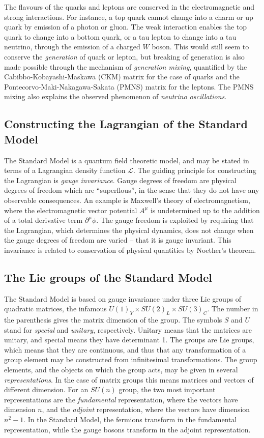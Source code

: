 \documentclass[twoside,english]{uiofysmaster}
\begin{document}
The flavours of the quarks and leptons are conserved in the electromagnetic and strong interactions. For instance, a top quark cannot change into a charm or up quark by emission of a photon or gluon. The weak interaction enables the top quark to change into a bottom quark, or a tau lepton to change into a tau neutrino, through the emission of a charged $W$ boson. This would still seem to conserve the {\it generation} of quark or lepton, but breaking of generation is also made possible through the mechanism of {\it generation mixing}, quantified by the Cabibbo-Kobayashi-Maskawa (CKM) matrix for the case of quarks and the Pontecorvo-Maki-Nakagawa-Sakata (PMNS) matrix for the leptons. The PMNS mixing also explains the observed phenomenon of {\it neutrino oscillations}.

\subsection{Constructing the Lagrangian of the Standard Model}

The Standard Model is a quantum field theoretic model, and may be stated in terms of a Lagrangian density function $\mathcal{L}$. The guiding principle for constructing the Lagrangian is {\it gauge invariance}. Gauge degrees of freedom are physical degrees of freedom which are ``superflous'', in the sense that they do not have any observable consequences. An example is Maxwell's theory of electromagnetism, where the electromagnetic vector potential $A^\mu$ is undetermined up to the addition of a total derivative term $\partial^\mu \phi$. The gauge freedom is exploited by requiring that the Lagrangian, which determines the physical dynamics, does not change when the gauge degrees of freedom are varied -- that it is gauge invariant. This invariance is related to conservation of physical quantities by Noether's theorem.

\subsection{The Lie groups of the Standard Model}

The Standard Model is based on gauge invariance under three Lie groups of quadratic matrices, the infamous $U(1)_Y\times SU(2)_L\times SU(3)_C$. The number in the parenthesis gives the matrix dimension of the group. The symbols $S$ and $U$ stand for {\it special} and {\it unitary}, respectively. Unitary means that the matrices are unitary, and special means they have determinant 1. The groups are Lie groups, which means that they are continuous, and thus that any transformation of a group element may be constructed from infinitesimal transformations. The group elements, and the objects on which the group acts, may be given in several {\it representations}. In the case of matrix groups this means matrices and vectors of different dimension. For an $SU(n)$ group, the two most important representations are the {\it fundamental} representation, where the vectors have dimension $n$, and the {\it adjoint} representation, where the vectors have dimension $n^2-1$. In the Standard Model, the fermions transform in the fundamental representation, while the gauge bosons transform in the adjoint representation.
\end{document}
